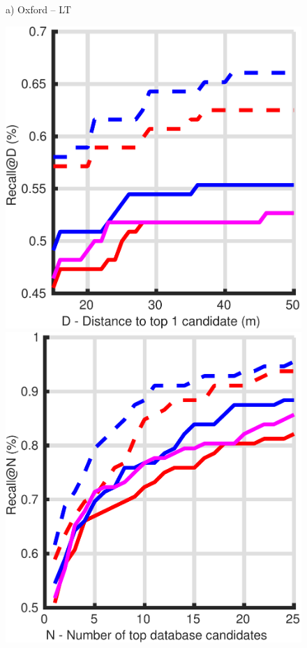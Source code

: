 \begin{figure}
\begin{minipage}{0.16\linewidth}
		a) Oxford -- LT
	\end{minipage}
	\begin{minipage}{0.16\linewidth}
		\center \scriptsize
		\includegraphics[width=\linewidth]{plot/oxf_cmu/Results_snow_queries/distance}	
		
		\includegraphics[width=\linewidth]{plot/oxf_cmu/Results_snow_queries/recall}
				

\end{minipage}
\end{figure}
